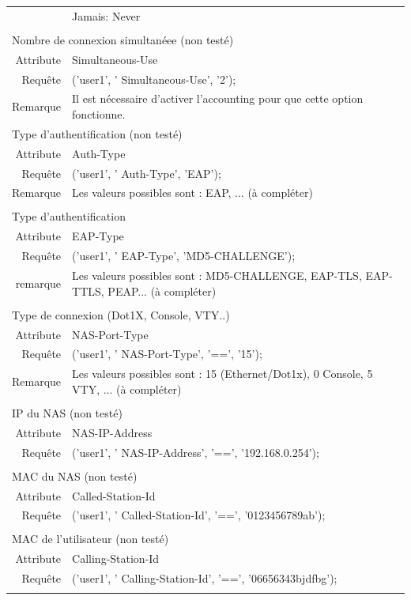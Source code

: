 \begin{tabular}{rl}
					 & Jamais: Never \\
	\\
	\multicolumn{2}{l}{Nombre de connexion simultanéee (non testé)} \\
  \hline
  Attribute &  Simultaneous-Use \\
  Requête & ('user1', ' Simultaneous-Use', '2'); \\
	Remarque & Il est nécessaire d'activer l'accounting pour que cette option fonctionne.
	\\
	\multicolumn{2}{l}{Type d'authentification (non testé)} \\
  \hline
  Attribute &  Auth-Type \\
  Requête & ('user1', ' Auth-Type', 'EAP'); \\
	Remarque & Les valeurs possibles sont : EAP, ... (à compléter) \\
	\\
	\multicolumn{2}{l}{Type d'authentification} \\
  \hline
  Attribute &  EAP-Type \\
  Requête & ('user1', ' EAP-Type', 'MD5-CHALLENGE'); \\
	remarque & Les valeurs possibles sont : MD5-CHALLENGE, EAP-TLS, EAP-TTLS, PEAP... (à compléter) \\
	\\
	\multicolumn{2}{l}{Type de connexion (Dot1X, Console, VTY..)} \\
  \hline
  Attribute &  NAS-Port-Type \\
  Requête & ('user1', ' NAS-Port-Type', '==', '15'); \\
	Remarque & Les valeurs possibles sont : 15 (Ethernet/Dot1x), 0 Console, 5 VTY, ... (à compléter) \\
	\\
	\multicolumn{2}{l}{IP du NAS (non testé)} \\
  \hline
  Attribute &  NAS-IP-Address \\
  Requête & ('user1', ' NAS-IP-Address', '==', '192.168.0.254'); \\
	\\
	\multicolumn{2}{l}{MAC du NAS (non testé)} \\
  \hline
  Attribute &  Called-Station-Id \\
  Requête & ('user1', ' Called-Station-Id', '==', '0123456789ab'); \\
	\\
	\multicolumn{2}{l}{MAC de l'utilisateur (non testé)} \\
  \hline
  Attribute &  Calling-Station-Id \\
  Requête & ('user1', ' Calling-Station-Id', '==', '06656343bjdfbg'); \\
	\\
\end{tabular}

